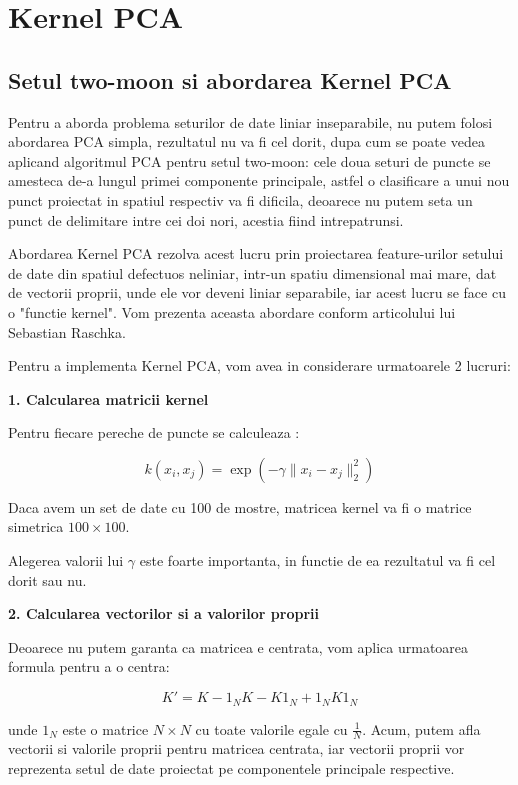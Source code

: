 \documentclass[12pt,oneside]{article}
\begin{document}
\newpage
\section{Kernel PCA}

\subsection{Setul two-moon si abordarea Kernel PCA}
Pentru a aborda problema seturilor de date liniar inseparabile, nu putem folosi abordarea PCA simpla, rezultatul nu va fi cel dorit, dupa cum se poate vedea aplicand algoritmul PCA pentru setul two-moon: cele doua seturi de puncte se amesteca de-a lungul primei componente principale, astfel o clasificare a unui nou punct proiectat in spatiul respectiv va fi dificila, deoarece nu putem seta un punct de delimitare intre cei doi nori, acestia fiind intrepatrunsi. 

Abordarea Kernel PCA rezolva acest lucru prin proiectarea feature-urilor setului de date din spatiul defectuos neliniar, intr-un spatiu dimensional mai mare, dat de vectorii proprii, unde ele vor deveni liniar separabile, iar acest lucru se face cu o "functie kernel". Vom prezenta aceasta abordare conform articolului lui Sebastian Raschka.\cite{kernel_pca}

Pentru a implementa Kernel PCA, vom avea in considerare urmatoarele 2 lucruri:

\textbf{1. Calcularea matricii kernel} 

Pentru fiecare pereche de puncte se calculeaza :

\begin{equation}
k(x_i,x_j)=\exp(-\gamma \|x_i - x_j\|_2^2)
\end{equation}

Daca avem un set de date cu 100 de mostre, matricea kernel va fi o matrice simetrica $100 \times 100$.

Alegerea valorii lui $\gamma$ este foarte importanta, in functie de ea rezultatul va fi cel dorit sau nu.

\textbf{2. Calcularea vectorilor si a valorilor proprii}

Deoarece nu putem garanta ca matricea e centrata, vom aplica urmatoarea formula pentru a o centra: 

\begin{equation}
K'=K-1_NK-K1_N+1_NK1_N
\end{equation}

unde $1_N$ este o matrice $N \times N$ cu toate valorile egale cu $\frac{1}{N}$.
Acum, putem afla vectorii si valorile proprii pentru matricea centrata, iar vectorii proprii vor reprezenta setul de date proiectat pe componentele principale respective.
\end{document}
